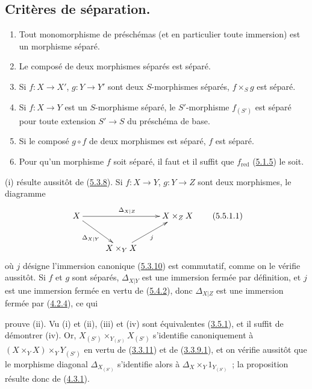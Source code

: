 \subsection{Critères de séparation.}
\label{subsection:I.5.5-fr}

\begin{proposition}[5.5.1]
\label{I.5.5.1-fr}
\begin{enumerate}
  \item[\rm(i)] Tout monomorphisme de préschémas (et en particulier toute
    immersion) est un morphisme séparé.
  \item[\rm(ii)] Le composé de deux morphismes séparés est séparé.
  \item[\rm(iii)] Si $f:X\to X'$, $g:Y\to Y'$ sont deux $S$-morphismes
    séparés, $f\times_S g$ est séparé.
  \item[\rm(iv)] Si $f:X\to Y$ est un $S$-morphisme séparé, le
    $S'$-morphisme $f_{(S')}$ est séparé pour toute extension $S'\to S$ du
    préschéma de base.
  \item[\rm(v)] Si le composé $g\circ f$ de deux morphismes est séparé, $f$
    est séparé.
  \item[\rm(vi)] Pour qu'un morphisme $f$ soit séparé, il faut et il suffit
    que $f_{\mathrm{red}}$ (\hyperref[I.5.1.5-fr]{5.1.5}) le soit.
\end{enumerate}
\end{proposition}

(i) résulte aussitôt de (\hyperref[I.5.3.8-fr]{5.3.8}). Si $f:X\to Y$,
$g:Y\to Z$ sont deux morphismes, le diagramme
\[
  \xymatrix{
    X\ar[rr]^{\Delta_{X|Z}}\ar[dr]_{\Delta_{X|Y}} & &
    X\times_Z X\\
    & X\times_Y X\ar[ur]_j
  }
  \tag{5.5.1.1}\label{I.5.5.1.1-fr}
\]
où $j$ désigne l'immersion canonique (\hyperref[I.5.3.10-fr]{5.3.10}) est
commutatif, comme on le vérifie aussitôt. Si $f$ et $g$ sont séparés,
$\Delta_{X|Y}$ est une immersion fermée par définition, et $j$ est une
immersion fermée en vertu de (\hyperref[I.5.4.2-fr]{5.4.2}), donc
$\Delta_{X|Z}$ est une immersion fermée par
(\hyperref[I.4.2.4-fr]{4.2.4}), ce qui

prouve (ii). Vu (i) et (ii), (iii) et (iv) sont équivalentes
(\hyperref[I.3.5.1-fr]{3.5.1}), et il suffit de démontrer (iv). Or,
$X_{(S')}\times_{Y_{(S')}}X_{(S')}$ s'identifie canoniquement à
$(X\times_Y X)\times_Y Y_{(S')}$ en vertu de
(\hyperref[I.3.3.11-fr]{3.3.11}) et de
(\hyperref[I.3.3.9.1-fr]{3.3.9.1}), et on vérifie aussitôt que le morphisme
diagonal $\Delta_{X_{(S')}}$ s'identifie alors à
$\Delta_X\times_Y 1_{Y_{(S')}}$~; la proposition résulte donc de
(\hyperref[I.4.3.1-fr]{4.3.1}).


